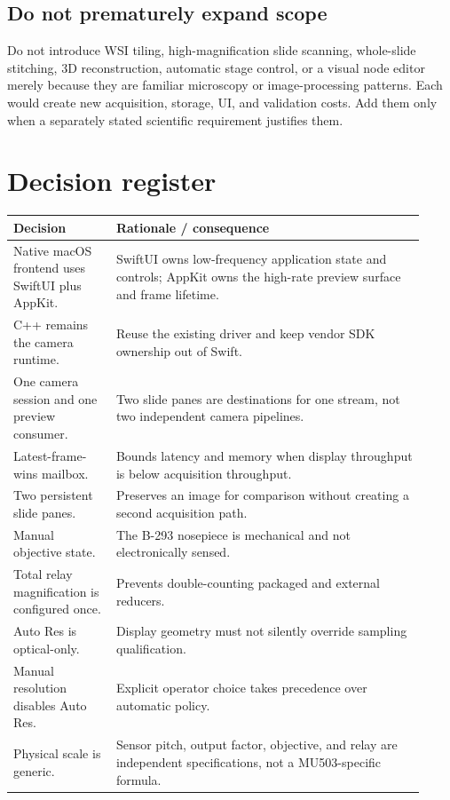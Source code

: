 \documentclass[11pt,a4paper,oneside]{article}
\begin{document}
\subsection{Do not prematurely expand scope}
Do not introduce WSI tiling, high-magnification slide scanning, whole-slide stitching, 3D reconstruction, automatic stage control, or a visual node editor merely because they are familiar microscopy or image-processing patterns. Each would create new acquisition, storage, UI, and validation costs. Add them only when a separately stated scientific requirement justifies them.

\section{Decision register}

\begin{longtable}{p{0.23\linewidth}p{0.69\linewidth}}
\toprule
Decision & Rationale / consequence\\
\midrule
Native macOS frontend uses SwiftUI plus AppKit. & SwiftUI owns low-frequency application state and controls; AppKit owns the high-rate preview surface and frame lifetime.\\
C++ remains the camera runtime. & Reuse the existing driver and keep vendor SDK ownership out of Swift.\\
One camera session and one preview consumer. & Two slide panes are destinations for one stream, not two independent camera pipelines.\\
Latest-frame-wins mailbox. & Bounds latency and memory when display throughput is below acquisition throughput.\\
Two persistent slide panes. & Preserves an image for comparison without creating a second acquisition path.\\
Manual objective state. & The B-293 nosepiece is mechanical and not electronically sensed.\\
Total relay magnification is configured once. & Prevents double-counting packaged and external reducers.\\
Auto Res is optical-only. & Display geometry must not silently override sampling qualification.\\
Manual resolution disables Auto Res. & Explicit operator choice takes precedence over automatic policy.\\
Physical scale is generic. & Sensor pitch, output factor, objective, and relay are independent specifications, not a MU503-specific formula.\\

\end{longtable}
\end{document}
